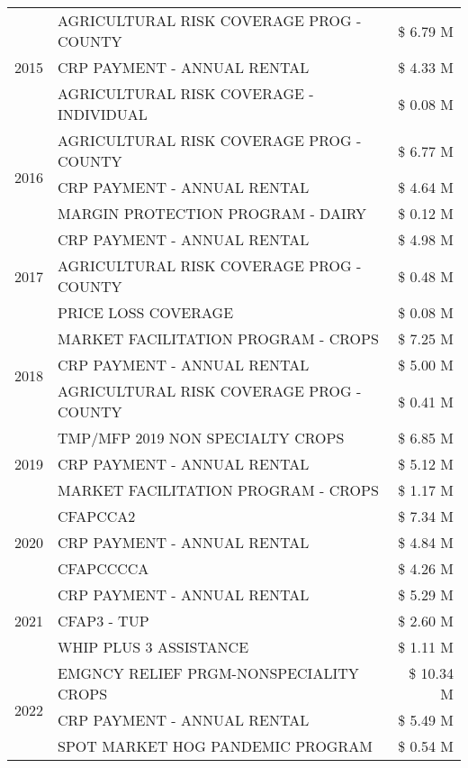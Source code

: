 \begin{tabular}{llr}
\cline{1-3}
\multirow[t]{3}{*}{2015} & AGRICULTURAL RISK COVERAGE PROG - COUNTY & \$ 6.79 M \\
 & CRP PAYMENT - ANNUAL RENTAL & \$ 4.33 M \\
 & AGRICULTURAL RISK COVERAGE - INDIVIDUAL & \$ 0.08 M \\
\cline{1-3}
\multirow[t]{3}{*}{2016} & AGRICULTURAL RISK COVERAGE PROG - COUNTY & \$ 6.77 M \\
 & CRP PAYMENT - ANNUAL RENTAL & \$ 4.64 M \\
 & MARGIN PROTECTION PROGRAM - DAIRY & \$ 0.12 M \\
\cline{1-3}
\multirow[t]{3}{*}{2017} & CRP PAYMENT - ANNUAL RENTAL & \$ 4.98 M \\
 & AGRICULTURAL RISK COVERAGE PROG - COUNTY & \$ 0.48 M \\
 & PRICE LOSS COVERAGE & \$ 0.08 M \\
\cline{1-3}
\multirow[t]{3}{*}{2018} & MARKET FACILITATION PROGRAM - CROPS & \$ 7.25 M \\
 & CRP PAYMENT - ANNUAL RENTAL & \$ 5.00 M \\
 & AGRICULTURAL RISK COVERAGE PROG - COUNTY & \$ 0.41 M \\
\cline{1-3}
\multirow[t]{3}{*}{2019} & TMP/MFP 2019 NON SPECIALTY CROPS & \$ 6.85 M \\
 & CRP PAYMENT - ANNUAL RENTAL & \$ 5.12 M \\
 & MARKET FACILITATION PROGRAM - CROPS & \$ 1.17 M \\
\cline{1-3}
\multirow[t]{3}{*}{2020} & CFAPCCA2 & \$ 7.34 M \\
 & CRP PAYMENT - ANNUAL RENTAL & \$ 4.84 M \\
 & CFAPCCCCA & \$ 4.26 M \\
\cline{1-3}
\multirow[t]{3}{*}{2021} & CRP PAYMENT - ANNUAL RENTAL & \$ 5.29 M \\
 & CFAP3 - TUP & \$ 2.60 M \\
 & WHIP PLUS 3 ASSISTANCE & \$ 1.11 M \\
\cline{1-3}
\multirow[t]{3}{*}{2022} & EMGNCY RELIEF PRGM-NONSPECIALITY CROPS & \$ 10.34 M \\
 & CRP PAYMENT - ANNUAL RENTAL & \$ 5.49 M \\
 & SPOT MARKET HOG PANDEMIC PROGRAM & \$ 0.54 M \\
\cline{1-3}
\bottomrule
\end{tabular}
